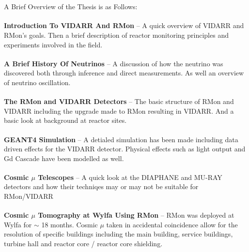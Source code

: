 \\\\A Brief Overview of the Thesis is as Follows:
\\\\\textbf{Introduction To VIDARR And RMon} -- A quick overview of VIDARR and RMon's goals. Then a brief description of reactor monitoring principles and experiments involved in the field. 
\\\\\textbf{A Brief History Of Neutrinos} -- A discussion of how the neutrino was discovered both through inference and direct measurements. As well an overview of neutrino oscillation.
\\\\\textbf{The RMon and VIDARR Detectors} -- The basic structure of RMon and VIDARR including the upgrade made to RMon resulting in VIDARR. And a basic look at background at reactor sites.
\\\\\textbf{GEANT4 Simulation} -- A detialed simulation has been made including data driven effects for the VIDARR detector. Physical effects such as light output and Gd Cascade have been modelled as well. 
\\\\\textbf{Cosmic $\mu$ Telescopes} -- A quick look at the DIAPHANE and MU-RAY detectors and how their techniqes may or may not be suitable for RMon/VIDARR 
\\\\\textbf{Cosmic $\mu$ Tomography at Wylfa Using RMon} -- RMon was deployed at Wylfa for $\sim$ 18 months. Cosmic $\mu$ taken in accidental coincidence allow for the resolution of specific buildings including the main building, service buildings, turbine hall and reactor core / reactor core shielding.